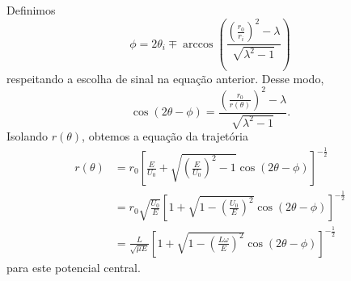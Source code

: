 Definimos
\begin{equation}
    \phi = 2\theta_i \mp \arccos{\left(\frac{\left(\frac{r_0}{r_i}\right)^2 - \lambda}{\sqrt{\lambda^2 - 1}}\right)}
\end{equation}
respeitando a escolha de sinal na equação anterior. Desse modo,
\begin{equation}
    \cos{(2\theta - \phi)} = \frac{\left(\frac{r_0}{r(\theta)}\right)^2-\lambda}{\sqrt{\lambda^2 - 1}}.
\end{equation}
Isolando \(r(\theta)\), obtemos a equação da trajetória
\begin{align}
    r(\theta) &= r_0\left[\frac{E}{U_0} + \sqrt{\left(\frac{E}{U_0}\right)^2 - 1}\cos{(2\theta - \phi)}\right]^{-\frac12}\\
              &= r_0\sqrt{\frac{U_0}{E}}\left[1 + \sqrt{1 - \left(\frac{U_0}{E}\right)^2}\cos{(2\theta - \phi)}\right]^{-\frac12}\\
              &= \frac{L}{\sqrt{\mu E}} \left[1 + \sqrt{1 - \left(\frac{L\omega}{E}\right)^2}\cos{(2\theta - \phi)}\right]^{-\frac12}
\end{align}
para este potencial central.
